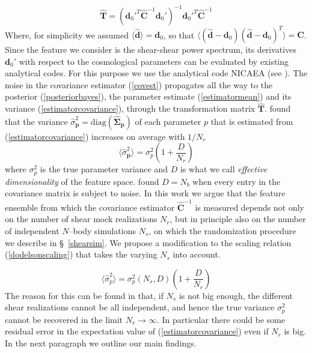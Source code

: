 \documentclass[reprint,aps,prd,superscriptaddress,showkeys,showpacs]{revtex4-1}
\newcommand{\bb}[1]{\mathbf{#1}}
\newcommand{\bbh}[1]{\mathbf{\hat{#1}}}
\newcommand{\h}[1]{\hat{#1}}
\begin{document}
\begin{equation}
\bbh{T} = (\bb{d}_0'^T\bbh{C}^{-1}\bb{d}_0')^{-1}\bb{d}_0'^T\bbh{C}^{-1}
\end{equation}
%
Where, for simplicity we assumed $\langle\bbh{d}\rangle=\bb{d}_0$, so that $\langle(\bbh{d}-\bb{d}_0)(\bbh{d}-\bb{d}_0)^T\rangle=\bb{C}$. Since the feature we consider is the shear-shear power spectrum, its derivatives $\bb{d}_0'$ with respect to the cosmological parameters can be evaluated by existing analytical codes. For this purpose we use the analytical code NICAEA (see \citep{Nicaea}). The noise in the covariance estimator (\ref{covest}) propagates all the way to the posterior (\ref{posteriorbayes}), the parameter estimate (\ref{estimatormean}) and its variance (\ref{estimatorcovariance}), through the transformation matrix $\bbh{T}$. \citep{DodelsonSchneider13} found that the variance $\h{\sigma}^2_\bb{p}=\mathrm{diag}(\bbh{\Sigma}_\bb{p})$ of each parameter $p$ that is estimated from (\ref{estimatorcovariance}) increases on average with $1/N_r$
\begin{equation}
\label{dodelsonscaling}
\langle\h{\sigma}_\bb{p}^2\rangle = \sigma_p^2\left(1+\frac{D}{N_r}\right)
\end{equation} 
%
where $\sigma^2_p$ is the true parameter variance and $D$ is what we call \textit{effective dimensionality} of the feature space. \citep{DodelsonSchneider13} found $D=N_b$ when every entry in the covariance matrix is subject to noise. In this work we argue that the feature ensemble from which the covariance estimator $\bbh{C}^{-1}$ is measured depends not only on the number of shear mock realizations $N_r$, but in principle also on the number of independent $N$--body simulations $N_s$, on which the randomization procedure we describe in \S~\ref{shearsim}. We propose a modification to the scaling relation (\ref{dodelsonscaling}) that takes the varying $N_s$ into account. 

\begin{equation}
\label{ourscaling}
\langle\h{\sigma}_p^2\rangle = \sigma^2_p(N_s,D)\left(1+\frac{D}{N_r}\right)
\end{equation} 
%
The reason for this can be found in that, if $N_s$ is not big enough, the different shear realizations cannot be all independent, and hence the true variance $\sigma^2_p$ cannot be recovered in the limit $N_r\rightarrow\infty$. In particular there could be some residual error in the expectation value of (\ref{estimatorcovariance}) even if $N_r$ is big. In the next paragraph we outline our main findings. 
\end{document}
